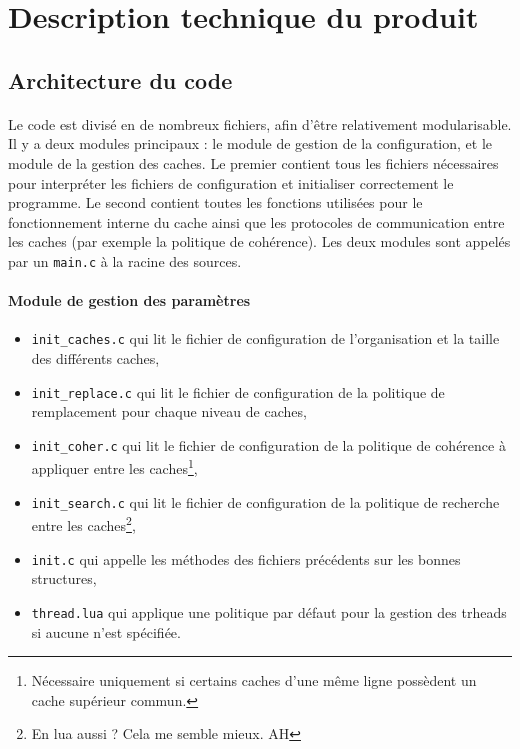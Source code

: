 \section{Description technique du produit}

\subsection{Architecture du code}

\paragraph{}
Le code est divisé en de nombreux fichiers, afin d'être relativement modularisable. Il y a deux modules principaux : le module de gestion de la configuration, et le module de la gestion des caches. Le premier contient tous les fichiers nécessaires pour interpréter les fichiers de configuration et initialiser correctement le programme. Le second contient toutes les fonctions utilisées pour le fonctionnement interne du cache ainsi que les protocoles de communication entre les caches (par exemple la politique de cohérence). Les deux modules sont appelés par un \verb!main.c! à la racine des sources.

\paragraph{Module de gestion des paramètres}
\begin{itemize}
\item{\verb!init_caches.c! qui lit le fichier de configuration de l'organisation et la taille des différents caches,}
\item{\verb!init_replace.c! qui lit le fichier de configuration de la politique de remplacement pour chaque niveau de caches,}
\item{\verb!init_coher.c! qui lit le fichier de configuration de la politique de cohérence à appliquer entre les caches\footnote{Nécessaire uniquement si certains caches d'une même ligne possèdent un cache supérieur commun.},}
\item{\verb!init_search.c! qui lit le fichier de configuration de la politique de recherche entre les caches\footnote{En lua aussi ? Cela me semble mieux. AH},}
\item{\verb!init.c! qui appelle les méthodes des fichiers précédents sur les bonnes structures,}
\item{\verb!thread.lua! qui applique une politique par défaut pour la gestion des trheads si aucune n'est spécifiée.}
\end{itemize}

